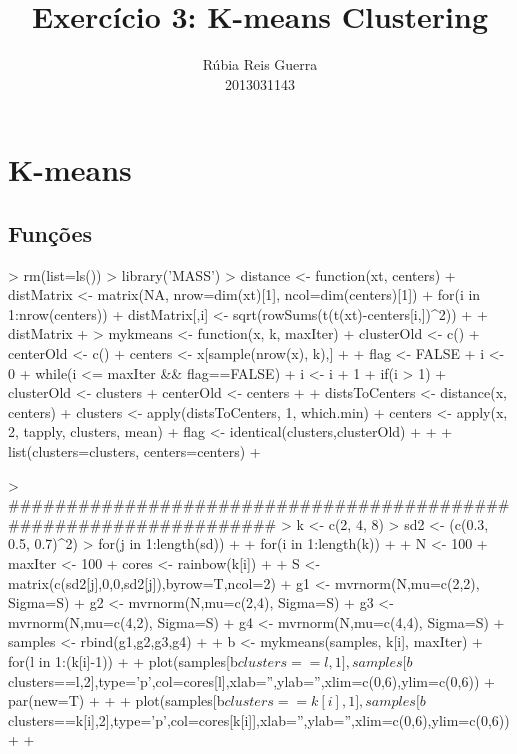 \documentclass{article}
\title{Exercício 3: K-means Clustering}
\author{Rúbia Reis Guerra \\ 2013031143}
\begin{document}


\section{K-means}

\subsection{Funções}
\begin{Schunk}
\begin{Sinput}
> rm(list=ls())
> library('MASS')
> distance <- function(xt, centers){
+   distMatrix <- matrix(NA, nrow=dim(xt)[1], ncol=dim(centers)[1])
+   for(i in 1:nrow(centers)) {
+     distMatrix[,i] <- sqrt(rowSums(t(t(xt)-centers[i,])^2))
+   }
+   distMatrix
+ }
> mykmeans <- function(x, k, maxIter) {
+   clusterOld <- c()
+   centerOld <- c()
+   centers <- x[sample(nrow(x), k),]
+   
+   flag <- FALSE
+   i <- 0
+   while(i <= maxIter && flag==FALSE) {
+     i <- i + 1
+     if(i > 1) {
+       clusterOld <- clusters
+       centerOld <- centers
+     }
+     distsToCenters <- distance(x, centers)
+     clusters <- apply(distsToCenters, 1, which.min)
+     centers <- apply(x, 2, tapply, clusters, mean)
+     flag <- identical(clusters,clusterOld)
+   }
+ 
+   list(clusters=clusters, centers=centers)
+ }
\end{Sinput}
\end{Schunk}

\begin{Schunk}
\begin{Sinput}
> ##################################################################
> k <- c(2, 4, 8)
> sd2 <- (c(0.3, 0.5, 0.7)^2)
> for(j in 1:length(sd))
+ {
+   for(i in 1:length(k))
+   { 
+     N <- 100
+     maxIter <- 100
+     cores <- rainbow(k[i])
+     
+     S <- matrix(c(sd2[j],0,0,sd2[j]),byrow=T,ncol=2)
+     g1 <- mvrnorm(N,mu=c(2,2), Sigma=S)
+     g2 <- mvrnorm(N,mu=c(2,4), Sigma=S)
+     g3 <- mvrnorm(N,mu=c(4,2), Sigma=S)
+     g4 <- mvrnorm(N,mu=c(4,4), Sigma=S)
+     samples <- rbind(g1,g2,g3,g4)
+     
+     b <- mykmeans(samples, k[i], maxIter)
+     for(l in 1:(k[i]-1))
+     {
+       plot(samples[b$clusters==l,1],samples[b$clusters==l,2],type='p',col=cores[l],xlab='',ylab='',xlim=c(0,6),ylim=c(0,6))
+       par(new=T)
+     }
+     
+     plot(samples[b$clusters==k[i],1],samples[b$clusters==k[i],2],type='p',col=cores[k[i]],xlab='',ylab='',xlim=c(0,6),ylim=c(0,6))
+   }
+ }
\end{Sinput}
\end{Schunk}
\end{document}
